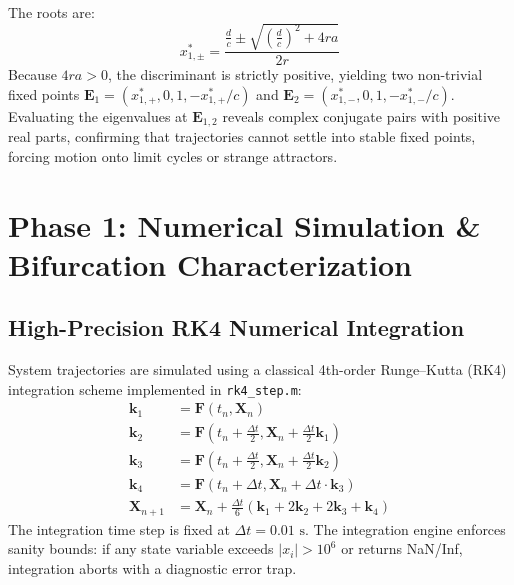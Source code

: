 \documentclass[12pt,a4paper,oneside]{report}
\begin{document}
\begin{enumerate}
\begin{equation}
    \end{equation}
    The roots are:
    \begin{equation}
        x_{1,\pm}^* = \frac{\frac{d}{c} \pm \sqrt{\left(\frac{d}{c}\right)^2 + 4ra}}{2r}
    \end{equation}
    Because $4ra > 0$, the discriminant is strictly positive, yielding two non-trivial fixed points $\mathbf{E}_1 = (x_{1,+}^*, 0, 1, -x_{1,+}^*/c)$ and $\mathbf{E}_2 = (x_{1,-}^*, 0, 1, -x_{1,-}^*/c)$. Evaluating the eigenvalues at $\mathbf{E}_{1,2}$ reveals complex conjugate pairs with positive real parts, confirming that trajectories cannot settle into stable fixed points, forcing motion onto limit cycles or strange attractors.
\end{enumerate}

\chapter{Phase 1: Numerical Simulation \& Bifurcation Characterization}

\section{High-Precision RK4 Numerical Integration}
System trajectories are simulated using a classical 4th-order Runge--Kutta (RK4) integration scheme implemented in \texttt{rk4\_step.m}:
\begin{align}
    \mathbf{k}_1 &= \mathbf{F}(t_n, \mathbf{X}_n) \\
    \mathbf{k}_2 &= \mathbf{F}\left(t_n + \frac{\Delta t}{2}, \mathbf{X}_n + \frac{\Delta t}{2} \mathbf{k}_1\right) \\
    \mathbf{k}_3 &= \mathbf{F}\left(t_n + \frac{\Delta t}{2}, \mathbf{X}_n + \frac{\Delta t}{2} \mathbf{k}_2\right) \\
    \mathbf{k}_4 &= \mathbf{F}(t_n + \Delta t, \mathbf{X}_n + \Delta t \cdot \mathbf{k}_3) \\
    \mathbf{X}_{n+1} &= \mathbf{X}_n + \frac{\Delta t}{6} (\mathbf{k}_1 + 2\mathbf{k}_2 + 2\mathbf{k}_3 + \mathbf{k}_4)
\end{align}
The integration time step is fixed at $\Delta t = 0.01\text{ s}$. The integration engine enforces sanity bounds: if any state variable exceeds $|x_i| > 10^6$ or returns NaN/Inf, integration aborts with a diagnostic error trap.
\end{document}
